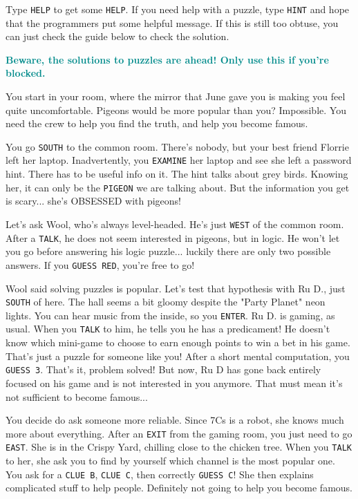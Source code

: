 \documentclass{article}
\newcommand{\bo}[1] {\textbf{#1}}
\newcommand{\bblu}[1] {\textbf{\textcolor{darkcyan}{#1}}}
\newcommand{\bckg}[1]{\AddToShipoutPictureBG*{\texttt{[image: \#1]}}}
\begin{document}
Type \texttt{HELP} to get some \texttt{HELP}.
If you need help with a puzzle, type \texttt{HINT} and hope that the programmers put some helpful message.
If this is still too obtuse, you can just check the guide below to check the solution.

\clearpage

\clearpage
{}
\bckg{img/bg}

\bblu{\bo{Beware, the solutions to puzzles are ahead! Only use this if you're blocked.}}

You start in your room, where the mirror that June gave you is making you feel quite uncomfortable.
Pigeons would be more popular than you? Impossible.
You need the crew to help you find the truth, and help you become famous.

You go \texttt{SOUTH} to the common room.
There's nobody, but your best friend Florrie left her laptop.
Inadvertently, you \texttt{EXAMINE} her laptop and see she left a password hint.
There has to be useful info on it. The hint talks about grey birds.
Knowing her, it can only be the \texttt{PIGEON} we are talking about.
But the information you get is scary... she's OBSESSED with pigeons!

Let's ask Wool, who's always level-headed. He's just \texttt{WEST} of the common room.
After a \texttt{TALK}, he does not seem interested in pigeons, but in logic.
He won't let you go before answering his logic puzzle... luckily there are only two possible answers.
If you \texttt{GUESS RED}, you're free to go!

Wool said solving puzzles is popular.
Let's test that hypothesis with Ru D., just \texttt{SOUTH} of here.
The hall seems a bit gloomy despite the "Party Planet" neon lights.
You can hear music from the inside, so you \texttt{ENTER}.
Ru D. is gaming, as usual. When you \texttt{TALK} to him, he tells you he has a predicament!
He doesn't know which mini-game to choose to earn enough points to win a bet in his game.
That's just a puzzle for someone like you!
After a short mental computation, you \texttt{GUESS 3}. That's it, problem solved!
But now, Ru D has gone back entirely focused on his game and is not interested in you anymore.
That must mean it's not sufficient to become famous...

You decide do ask someone more reliable.
Since 7Cs is a robot, she knows much more about everything.
After an \texttt{EXIT} from the gaming room, you just need to go \texttt{EAST}.
She is in the Crispy Yard, chilling close to the chicken tree.
When you \texttt{TALK} to her, she ask you to find by yourself which channel is the most popular one.
You ask for a \texttt{CLUE B}, \texttt{CLUE C}, then correctly \texttt{GUESS C}!
She then explains complicated stuff to help people.
Definitely not going to help you become famous.
\end{document}

